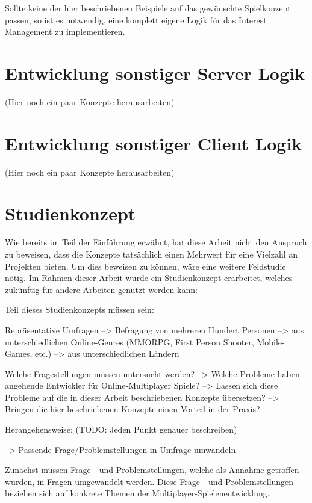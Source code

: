 Sollte keine der hier beschriebenen Beispiele auf das gewünschte Spielkonzept passen, so ist es notwendig, eine komplett eigene Logik für das Interest Management zu implementieren. 

\section{Entwicklung sonstiger Server Logik}

(Hier noch ein paar Konzepte herausarbeiten)

\section{Entwicklung sonstiger Client Logik}

(Hier noch ein paar Konzepte herausarbeiten)


\section{Studienkonzept}
\label{sec:studienkonzept}

Wie bereits im Teil der Einführung erwähnt, hat diese Arbeit nicht den Anspruch zu beweisen, dass die Konzepte tatsächlich einen Mehrwert für eine Vielzahl an Projekten bieten. Um dies beweisen zu können, wäre eine weitere Feldstudie nötig. Im Rahmen dieser Arbeit wurde ein Studienkonzept erarbeitet, welches zukünftig für andere Arbeiten genutzt werden kann:

Teil dieses Studienkonzepts müssen sein:

Repräsentative Umfragen
	--> Befragung von mehreren Hundert Personen
	--> aus unterschiedlichen Online-Genres (MMORPG, First Person Shooter, Mobile-Games, etc.)
	--> aus unterschiedlichen Ländern
	
Welche Fragestellungen müssen untersucht werden?
	--> Welche Probleme haben angehende Entwickler für Online-Multiplayer Spiele?
	--> Lassen sich diese Probleme auf die in dieser Arbeit beschriebenen Konzepte übersetzen?
	--> Bringen die hier beschriebenen Konzepte einen Vorteil in der Praxis?

Herangehensweise: (TODO: Jeden Punkt genauer beschreiben)

	--> Passende Frage/Problemstellungen in Umfrage umwandeln
	
Zunächst müssen Frage - und Problemstellungen, welche als Annahme getroffen wurden, in Fragen umgewandelt werden. Diese Frage - und Problemstellungen beziehen sich auf konkrete Themen der Multiplayer-Spielenentwicklung.
	
